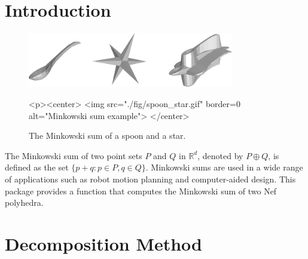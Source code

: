 
\ccParDims


%

\section{Introduction}

\begin{figure}[h]
  \begin{ccTexOnly}
    \begin{center}
      \includegraphics[width=0.8\textwidth]{Minkowski_sum_3/fig/spoon_star}
    \end{center}
  \end{ccTexOnly}
  \begin{ccHtmlOnly}
    <p><center>
    <img src="./fig/spoon_star.gif" border=0 alt="Minkowski sum example">
    </center>
  \end{ccHtmlOnly}
  \caption{The Minkowski sum of a spoon and a star.}
\end{figure}

The Minkowski sum of two point sets $P$ and $Q$ in $\mathbb{R}^d$, denoted by
$P \oplus Q$, is defined as the set $\{p+q:p \in P, q \in Q
\}$. Minkowski sums are used in a wide range of applications such as
robot motion planning and computer-aided design. This
package provides a function that computes the Minkowski sum of two Nef
polyhedra.

\section{Decomposition Method}


